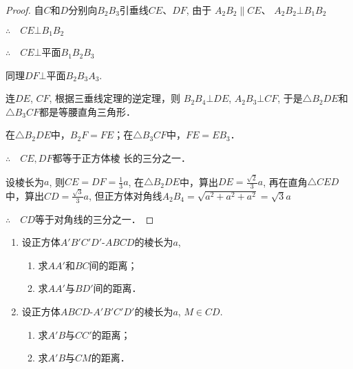 \begin{proof}
  自$C$和$D$分别向$B_2B_3$引垂线$CE$、$DF$, 由于
$A_2B_2\parallel CE$、 $A_2B_2\bot B_1B_2$

$\therefore\quad CE\bot B_1B_2$

$\therefore\quad CE\bot$平面$B_1B_2B_3$

同理$DF\bot $平面$B_2B_3A_3$.

连$DE$, $CF$, 根据三垂线定理的逆定理，则
$B_2B_4\bot DE$, $A_2B_3\bot CF$, 于是$\triangle B_2DE$和$\triangle B_3CF$都是等腰直角三角形．

在$\triangle B_2DE$中，$B_2F=FE$；在$\triangle B_3CF$中，$FE=EB_3$．

$\therefore\quad CE, DF$都等于正方体棱
长的三分之一．

设棱长为$a$, 则$CE=DF=\frac{1}{3}a$, 在$\triangle B_2DE$中，算出$DE=\frac{\sqrt{2}}{3}a$, 再在直角$\triangle CED$中，算出$CD=\frac{\sqrt{3}}{3}a$, 但正方体对角线$A_2B_4=\sqrt{a^2+a^2+a^2}=\sqrt{3}a$

$\therefore\quad CD$等于对角线的三分之一．
\end{proof}

\begin{ex}
\begin{enumerate}
  \item 设正方体$A'B'C'D'$-$ABCD$的棱长为$a$,
\begin{enumerate}
  \item 求$AA'$和$BC$间的距离；
  \item 求$AA'$与$BD'$间的距离．
\end{enumerate}
  
  \item 设正方体$ABCD$-$A'B'C'D'$的棱长为$a$, $M\in CD$.
\begin{enumerate}
  \item 求$A'B$与$CC'$的距离；
  \item 求$A'B$与$CM$的距离．
\end{enumerate}
\end{enumerate}
\end{ex}


